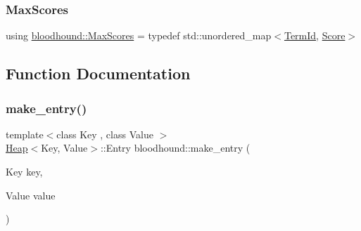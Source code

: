 \subsubsection{\texorpdfstring{Max\+Scores}{MaxScores}}
{\footnotesize\ttfamily using \hyperlink{namespacebloodhound_a687d80c6f992eba8b820bf30a482f4b4}{bloodhound\+::\+Max\+Scores} = typedef std\+::unordered\+\_\+map$<$\hyperlink{structbloodhound_1_1TermId}{Term\+Id}, \hyperlink{structbloodhound_1_1Score}{Score}$>$}



\subsection{Function Documentation}
\mbox{\label{namespacebloodhound_a64cca068dad32570cb036b6057cc86b6}} 
\subsubsection{\texorpdfstring{make\+\_\+entry()}{make\_entry()}}
{\footnotesize\ttfamily template$<$class Key , class Value $>$ \\
\hyperlink{classbloodhound_1_1Heap}{Heap}$<$Key, Value$>$\+::Entry bloodhound\+::make\+\_\+entry (\begin{DoxyParamCaption}\item[{Key}]{key,  }\item[{Value}]{value }\end{DoxyParamCaption})}

